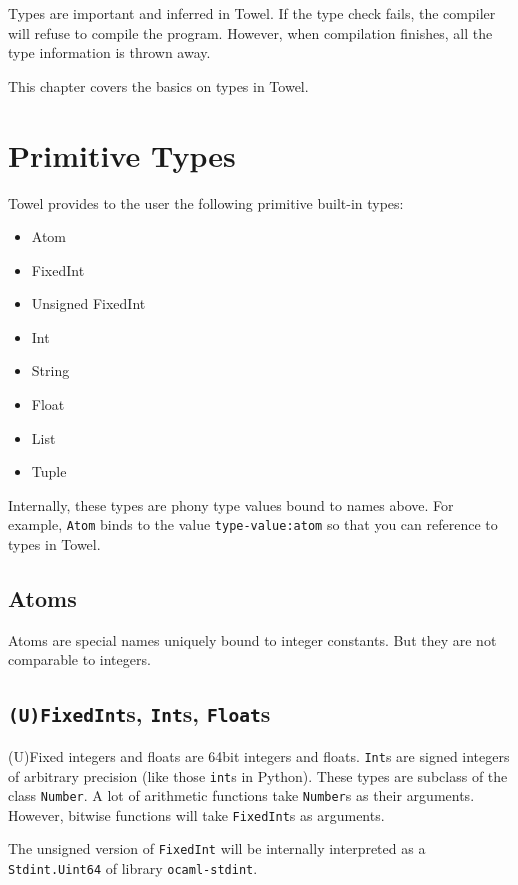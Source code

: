 \documentclass{book}
\begin{document}
Types are important and inferred in Towel. If the type check fails, the compiler will refuse to compile the program. However, when compilation finishes, all the type information is thrown away.

This chapter covers the basics on types in Towel.

\section{Primitive Types}

Towel provides to the user the following primitive built-in types:
\begin{itemize}
\item Atom
\item FixedInt
\item Unsigned FixedInt
\item Int
\item String
\item Float
\item List
\item Tuple
\end{itemize}

Internally, these types are phony type values bound to names above. For example, \texttt{Atom} binds to the value \texttt{type-value:atom} so that you can reference to types in Towel.

\subsection{Atoms}

Atoms are special names uniquely bound to integer constants. But they are not comparable to integers.

\subsection{\texttt{(U)FixedInt}s, \texttt{Int}s, \texttt{Float}s}

(U)Fixed integers and floats are 64bit integers and floats. \texttt{Int}s are signed integers of arbitrary precision (like those \texttt{int}s in Python). These types are subclass of the class \texttt{Number}. A lot of arithmetic functions take \texttt{Number}s as their arguments. However, bitwise functions will take \texttt{FixedInt}s as arguments.

The unsigned version of \texttt{FixedInt} will be internally interpreted as a \texttt{Stdint.Uint64} of library \texttt{ocaml-stdint}.
\end{document}
